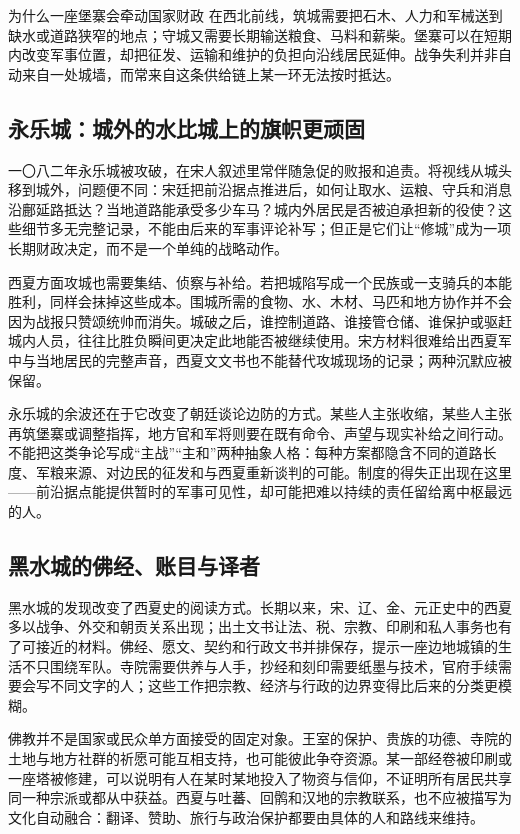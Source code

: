 \begin{causalchain}{为什么一座堡寨会牵动国家财政}
在西北前线，筑城需要把石木、人力和军械送到缺水或道路狭窄的地点；守城又需要长期输送粮食、马料和薪柴。堡寨可以在短期内改变军事位置，却把征发、运输和维护的负担向沿线居民延伸。战争失利并非自动来自一处城墙，而常来自这条供给链上某一环无法按时抵达。
\end{causalchain}

\subsection{永乐城：城外的水比城上的旗帜更顽固}

一〇八二年永乐城被攻破，在宋人叙述里常伴随急促的败报和追责。将视线从城头移到城外，问题便不同：宋廷把前沿据点推进后，如何让取水、运粮、守兵和消息沿鄜延路抵达？当地道路能承受多少车马？城内外居民是否被迫承担新的役使？这些细节多无完整记录，不能由后来的军事评论补写；但正是它们让“修城”成为一项长期财政决定，而不是一个单纯的战略动作。

西夏方面攻城也需要集结、侦察与补给。若把城陷写成一个民族或一支骑兵的本能胜利，同样会抹掉这些成本。围城所需的食物、水、木材、马匹和地方协作并不会因为战报只赞颂统帅而消失。城破之后，谁控制道路、谁接管仓储、谁保护或驱赶城内人员，往往比胜负瞬间更决定此地能否被继续使用。宋方材料很难给出西夏军中与当地居民的完整声音，西夏文文书也不能替代攻城现场的记录；两种沉默应被保留。

永乐城的余波还在于它改变了朝廷谈论边防的方式。某些人主张收缩，某些人主张再筑堡寨或调整指挥，地方官和军将则要在既有命令、声望与现实补给之间行动。不能把这类争论写成“主战”“主和”两种抽象人格：每种方案都隐含不同的道路长度、军粮来源、对边民的征发和与西夏重新谈判的可能。制度的得失正出现在这里——前沿据点能提供暂时的军事可见性，却可能把难以持续的责任留给离中枢最远的人。

\subsection{黑水城的佛经、账目与译者}

黑水城的发现改变了西夏史的阅读方式。长期以来，宋、辽、金、元正史中的西夏多以战争、外交和朝贡关系出现；出土文书让法、税、宗教、印刷和私人事务也有了可接近的材料。佛经、愿文、契约和行政文书并排保存，提示一座边地城镇的生活不只围绕军队。寺院需要供养与人手，抄经和刻印需要纸墨与技术，官府手续需要会写不同文字的人；这些工作把宗教、经济与行政的边界变得比后来的分类更模糊。

佛教并不是国家或民众单方面接受的固定对象。王室的保护、贵族的功德、寺院的土地与地方社群的祈愿可能互相支持，也可能彼此争夺资源。某一部经卷被印刷或一座塔被修建，可以说明有人在某时某地投入了物资与信仰，不证明所有居民共享同一种宗派或都从中获益。西夏与吐蕃、回鹘和汉地的宗教联系，也不应被描写为文化自动融合：翻译、赞助、旅行与政治保护都要由具体的人和路线来维持。

